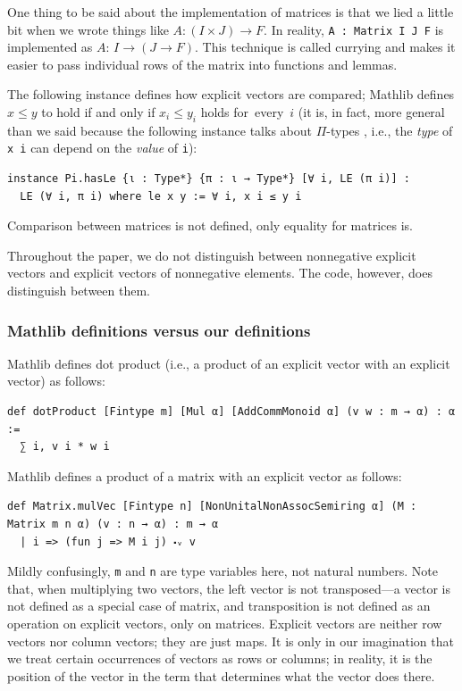 \documentclass[]{article}
\renewcommand{\.}{\hskip .75pt}
\let\r=\rightarrow
\begin{document}
One thing to be said about the implementation of matrices is that we lied
a little bit when we wrote things like $A : (I \times J) \r F$.
In reality, \texttt{A : Matrix I J F} is implemented as $A : \,I \r (J \r F)$.
This technique \cite{Currying} is called currying and makes it easier to
pass individual rows of the matrix into functions and lemmas.
\pagebreak[2]

The following instance defines how explicit vectors are compared;
Mathlib defines $x \le y$ to hold if and only if
$x_i \le y_i$ holds for~every~$i$ %
(it is, in fact, more general than we said because the following instance
talks about $\Pi$-types \cite{MLTT}, i.e.,
the \textit{type} of \texttt{x i} can depend on the \textit{value} of \texttt{i}):
\begin{lstlisting}
instance Pi.hasLe {ι : Type*} {π : ι → Type*} [∀ i, LE (π i)] :
  LE (∀ i, π i) where le x y := ∀ i, x i ≤ y i
\end{lstlisting}
Comparison between matrices is not defined, only equality for matrices is.

Throughout the paper, we do not distinguish between
nonnegative explicit vectors and explicit vectors of nonnegative elements.
The code, however, does distinguish between them.

\subsubsection{Mathlib definitions versus our definitions}
\label{versus}

Mathlib defines dot product (i.e., a product of an explicit vector with an explicit vector) as follows:
\begin{lstlisting}
def dotProduct [Fintype m] [Mul α] [AddCommMonoid α] (v w : m → α) : α :=
  ∑ i, v i * w i
\end{lstlisting}
Mathlib defines a product of a matrix with an explicit vector as follows:
\begin{lstlisting}
def Matrix.mulVec [Fintype n] [NonUnitalNonAssocSemiring α] (M : Matrix m n α) (v : n → α) : m → α
  | i => (fun j => M i j) ⬝ᵥ v
\end{lstlisting}
Mildly confusingly, \texttt{m} and \texttt{n} are type variables here, not natural numbers.
Note that, when multiplying two vectors,
the left vector is not transposed\:---\:a vector is not
defined as a special case of matrix, and transposition is not
defined as an operation on explicit vectors, only on matrices.
Explicit vectors are neither row vectors nor column vectors;
they are just maps. It is only in our imagination that we
treat certain occurrences of vectors as rows or columns;
in reality, it is the position of the vector in the term that
determines what the vector does there.
\end{document}
